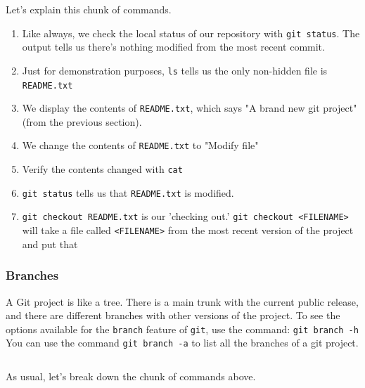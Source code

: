 \documentclass[11pt,fleqn]{article}
\theoremstyle{definition}
\begin{document}
Let's explain this chunk of commands.

\begin{enumerate}
\item Like always, we check the local status of our repository with \verb|git status|. The output tells us there's nothing modified from the most recent commit.

\item Just for demonstration purposes, \verb|ls| tells us the only non-hidden file is \verb|README.txt|

\item We display the contents of \verb|README.txt|, which says "A brand new git project" (from the previous section).

\item We change the contents of \verb|README.txt| to "Modify file"

\item Verify the contents changed with \verb|cat|

\item \verb|git status| tells us that \verb|README.txt| is modified.

\item \verb|git checkout README.txt| is our 'checking out.' \verb|git checkout <FILENAME>| will take a file called \verb|<FILENAME>| from the most recent version of the project and put that 

\end{enumerate}

\subsubsection{Branches}
A Git project is like a tree. There is a main trunk with the current public release, and there are different branches with other versions of the project. To see the options available for the \verb|branch| feature of \verb|git|, use the command: \texttt{git branch -h}\\
You can use the command \verb|git branch -a| to list all the branches of a git project.

\begin{verbatim}
\end{verbatim}

As usual, let's break down the chunk of commands above.
\end{document}
